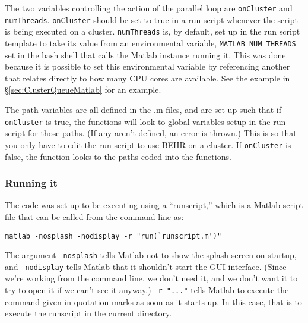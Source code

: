 \documentclass[12pt]{article}
\begin{document}
		The two variables controlling the action of the parallel loop are \lstinline[breaklines=true]|onCluster| and \lstinline[breaklines=true]|numThreads|. \lstinline[breaklines=true]|onCluster| should be set to true in a run script whenever the script is being executed on a cluster.  \lstinline[breaklines=true]|numThreads| is, by default, set up in the run script template to take its value from an environmental variable, \lstinline[breaklines=true]|MATLAB_NUM_THREADS| set in the bash shell that calls the Matlab instance running it.  This was done because it is possible to set this environmental variable by referencing another that relates directly to how many CPU cores are available.  See the example in \S\ref{sec:ClusterQueueMatlab} for an example.
		
		The path variables are all defined in the .m files, and are set up such that if \lstinline[breaklines=true]|onCluster| is true, the functions will look to global variables setup in the run script for those paths. (If any aren't defined, an error is thrown.)  This is so that you only have to edit the run script to use BEHR on a cluster.  If \lstinline[breaklines=true]|onCluster| is false, the function looks to the paths coded into the functions.

	\subsubsection{Running it}
		The code was set up to be executing using a ``runscript,'' which is a Matlab script file that can be called from the command line as:
\begin{lstlisting}
matlab -nosplash -nodisplay -r "run(`runscript.m')"
\end{lstlisting}
		The argument \lstinline[breaklines=true]|-nosplash| tells Matlab not to show the splash screen on startup, and \lstinline[breaklines=true]|-nodisplay| tells Matlab that it shouldn't start the GUI interface. (Since we're working from the command line, we don't need it, and we don't want it to try to open it if we can't see it anyway.) \lstinline[breaklines=true]|-r "..."| tells Matlab to execute the command given in quotation marks as soon as it starts up.  In this case, that is to execute the runscript in the current directory.
		
\end{document}
